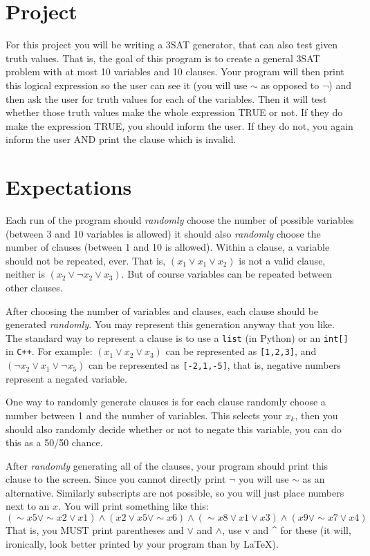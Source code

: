 \documentclass{article}
\begin{document}
\section{Project}
For this project you will be writing a 3SAT generator, that can also test given
truth values. That is, the goal of this program is to create a general 3SAT
problem with at most 10 variables and 10 clauses. Your program will then print
this logical expression so the user can see it (you will use $\sim$ as opposed
to $\neg$) and then ask the user for truth values for each of the variables.
Then it will test whether those truth values make the whole expression TRUE or
not. If they do make the expression TRUE, you should inform the user. If they do
not, you again inform the user AND print the clause which is invalid.

\section{Expectations}
Each run of the program should \emph{randomly} choose the number of possible
variables (between 3 and 10 variables is allowed) it should also \emph{randomly}
choose the number of clauses (between 1 and 10 is allowed). Within a clause, a
variable should not be repeated, ever. That is, $(x_1 \vee x_1 \vee x_2)$ is not
a valid clause, neither is $(x_2\vee \neg x_2 \vee x_3)$. But of course
variables can be repeated between other clauses.

After choosing the number of variables and clauses, each clause should be
generated \emph{randomly}. You may represent this generation anyway that you
like. The standard way to represent a clause is to use a \texttt{list} (in
Python) or an \texttt{int[]} in \texttt{C++}. For example: $(x_1\vee x_2 \vee
x_3)$ can be represented as \texttt{[1,2,3]}, and $(\neg x_2 \vee x_1 \vee \neg
x_5)$ can be represented as \texttt{[-2,1,-5]}, that is, negative numbers
represent a negated variable.

One way to randomly generate clauses is for each clause randomly choose a number
between 1 and the number of variables. This selects your $x_k$, then you should
also randomly decide whether or not to negate this variable, you can do this as
a 50/50 chance.

After \emph{randomly} generating all of the clauses, your program should print
this clause to the screen. Since you cannot directly print $\neg$ you will use
$\sim$ as an alternative. Similarly subscripts are not possible, so you will
just place numbers next to an $x$. You will print something like this:
\[
  (\sim x5 \vee \sim x2 \vee x1) \wedge (x2 \vee x5 \vee \sim x6) \wedge (\sim
  x8 \vee x1 \vee x3) \wedge (x9 \vee \sim x7 \vee x4)
\]
That is, you MUST print parentheses and $\vee$ and $\wedge$, use v and \^{} for
these (it will, ironically, look better printed by your program than by \LaTeX).
\end{document}
